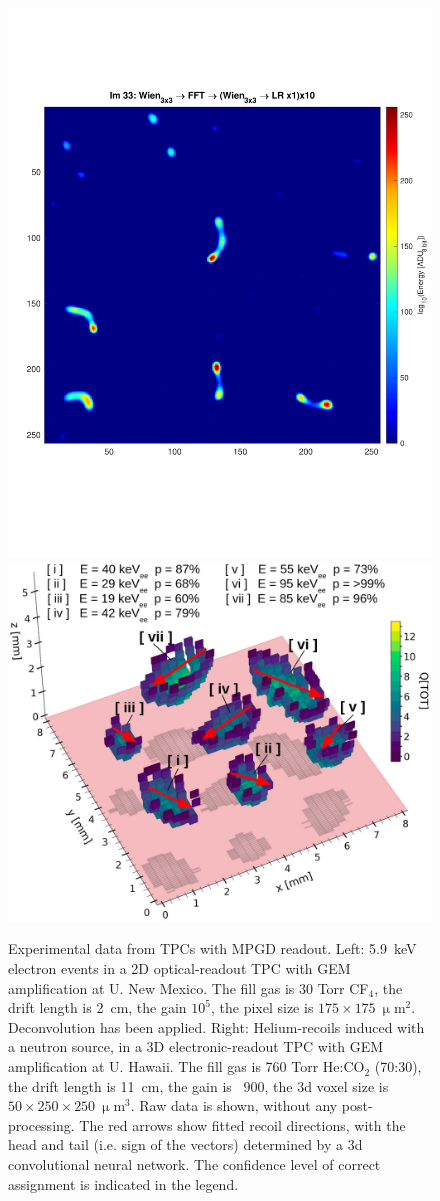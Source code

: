 \begin{figure}[!htbp]
\begin{center}
\includegraphics[width=0.49\columnwidth]{figures/optical_Fe55.pdf}
\includegraphics[width=0.49\columnwidth]{figures/BEAST_logain.png}
\caption{Experimental data from TPCs with MPGD readout. Left: 5.9~keV electron events in a 2D optical-readout TPC with GEM amplification at U. New Mexico. The fill gas is 30 Torr CF$_4$, the drift length is 2~cm, the gain $10^5$, the pixel size is $175 \times 175~\upmu$m$^2$. Deconvolution has been applied. Right: Helium-recoils induced with a neutron source, in a 3D electronic-readout TPC with GEM amplification at U. Hawaii. The fill gas is 760 Torr He:CO$_2$ (70:30), the drift length is 11~cm, the gain is ~$900$, the 3d voxel size is $50 \times 250 \times 250~\upmu$m$^3$. Raw data is shown, without any post-processing. The red arrows show fitted recoil directions, with the head and tail (i.e. sign of the vectors) determined by a 3d convolutional neural network. The confidence level of correct assignment is indicated in the legend. }\label{gas_tpc_events}
\end{center}
\end{figure}


